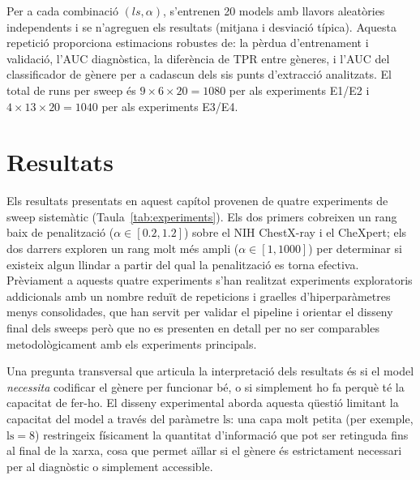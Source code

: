 \documentclass[a4paper,12pt,twoside]{ThesisStyle}
\begin{document}
Per a cada combinació $(ls, \alpha)$, s'entrenen 20 models amb llavors aleatòries independents i se n'agreguen els resultats (mitjana i desviació típica). Aquesta repetició proporciona estimacions robustes de: la pèrdua d'entrenament i validació, l'AUC diagnòstica, la diferència de TPR entre gèneres, i l'AUC del classificador de gènere per a cadascun dels sis punts d'extracció analitzats. El total de runs per sweep és $9 \times 6 \times 20 = 1080$ per als experiments E1/E2 i $4 \times 13 \times 20 = 1040$ per als experiments E3/E4.



\chapter{Resultats}
\label{cap:result}

Els resultats presentats en aquest capítol provenen de quatre experiments de sweep sistemàtic (Taula~\ref{tab:experiments}). Els dos primers cobreixen un rang baix de penalització ($\alpha \in [0.2, 1.2]$) sobre el NIH ChestX-ray i el CheXpert; els dos darrers exploren un rang molt més ampli ($\alpha \in [1, 1000]$) per determinar si existeix algun llindar a partir del qual la penalització es torna efectiva. Prèviament a aquests quatre experiments s'han realitzat experiments exploratoris addicionals amb un nombre reduït de repeticions i graelles d'hiperparàmetres menys consolidades, que han servit per validar el pipeline i orientar el disseny final dels sweeps però que no es presenten en detall per no ser comparables metodològicament amb els experiments principals.

Una pregunta transversal que articula la interpretació dels resultats és si el model \textit{necessita} codificar el gènere per funcionar bé, o si simplement ho fa perquè té la capacitat de fer-ho. El disseny experimental aborda aquesta qüestió limitant la capacitat del model a través del paràmetre $\text{ls}$: una capa molt petita (per exemple, $\text{ls} = 8$) restringeix físicament la quantitat d'informació que pot ser retinguda fins al final de la xarxa, cosa que permet aïllar si el gènere és estrictament necessari per al diagnòstic o simplement accessible.
\end{document}
